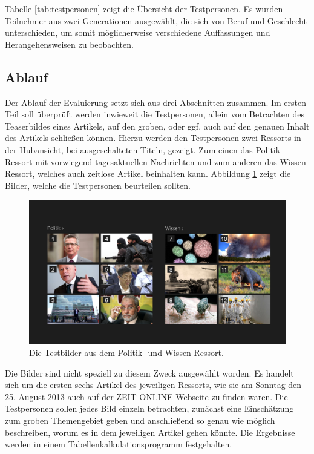\documentclass[12pt,a4paper,bibtotoc,abstracton]{scrartcl}
\begin{document}
Tabelle \ref{tab:testpersonen} zeigt die Übersicht der Testpersonen. Es wurden Teilnehmer aus zwei Generationen ausgewählt, die sich von Beruf und Geschlecht unterschieden, um somit möglicherweise verschiedene Auffassungen und Herangehensweisen zu beobachten.


\subsection{Ablauf}
\label{subsec:ablauf}
Der Ablauf der Evaluierung setzt sich aus drei Abschnitten zusammen. Im ersten Teil soll überprüft werden inwieweit die Testpersonen, allein vom Betrachten des Teaserbildes eines Artikels, auf den groben, oder ggf. auch auf den genauen Inhalt des Artikels schließen können. Hierzu werden den Testpersonen zwei Ressorts in der Hubansicht, bei ausgeschalteten Titeln, gezeigt. Zum einen das Politik-Ressort mit vorwiegend tagesaktuellen Nachrichten und zum anderen das Wissen-Ressort, welches auch zeitlose Artikel beinhalten kann. Abbildung \ref{fig:testbilder} zeigt die Bilder, welche die Testpersonen beurteilen sollten.

\begin{figure}[h]
	\centering
	\includegraphics[width=\textwidth]{Evaluierung/Testbilder/collage_politik_wissen_numbers.png} 
	\caption{Die Testbilder aus dem Politik- und Wissen-Ressort.}
	\label{fig:testbilder}
\end{figure}  

Die Bilder sind nicht speziell zu diesem Zweck ausgewählt worden. Es handelt sich um die ersten sechs Artikel des jeweiligen Ressorts, wie sie am Sonntag den 25. August 2013 auch auf der ZEIT ONLINE Webseite zu finden waren. Die Testpersonen sollen jedes Bild einzeln betrachten, zunächst eine Einschätzung zum groben Themengebiet geben und anschließend so genau wie möglich beschreiben, worum es in dem jeweiligen Artikel gehen könnte. Die Ergebnisse werden in einem Tabellenkalkulationsprogramm festgehalten.
\end{document}
